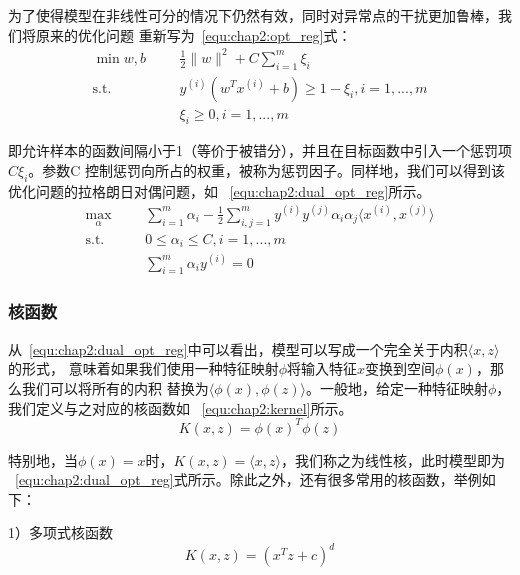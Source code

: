 为了使得模型在非线性可分的情况下仍然有效，同时对异常点的干扰更加鲁棒，我们将原来的优化问题
重新写为~\ref{equ:chap2:opt_reg}式：
\begin{equation}
  \label{equ:chap2:opt_reg}
  \begin{aligned}
    \min{w,b} &
    & & \frac{1}{2}\|w\|^2+C\sum_{i=1}^m\xi_i \\
    \text{s.t.} &
    & & y^{(i)}\left(w^Tx^{(i)}+b\right)\geq 1-\xi_i, i=1,...,m \\
    \quad &
    & & \xi_i \geq 0, i=1,...,m
  \end{aligned}
\end{equation}

即允许样本的函数间隔小于1（等价于被错分），并且在目标函数中引入一个惩罚项$C\xi_i$。参数C
控制惩罚向所占的权重，被称为惩罚因子。同样地，我们可以得到该优化问题的拉格朗日对偶问题，如
~\ref{equ:chap2:dual_opt_reg}所示。
\begin{equation}
  \label{equ:chap2:dual_opt_reg}
  \begin{aligned}
    \max_{\alpha} &
    & & \sum_{i=1}^m\alpha_i-\frac{1}{2}\sum_{i,j=1}^m
    y^{(i)}y^{(j)}\alpha_i\alpha_j\langle x^{(i)},x^{(j)}\rangle\\
    \text{s.t.} &
    & & 0\leq\alpha_i\leq C, i=1,...,m \\
    \quad &
    & & \sum_{i=1}^m\alpha_iy^{(i)}=0
  \end{aligned}
\end{equation}

\subsubsection{核函数}

从~\ref{equ:chap2:dual_opt_reg}中可以看出，模型可以写成一个完全关于内积$\langle x,z\rangle$的形式，
意味着如果我们使用一种特征映射$\phi$将输入特征$x$变换到空间$\phi(x)$，那么我们可以将所有的内积
替换为$\langle\phi(x),\phi(z)\rangle$。一般地，给定一种特征映射$\phi$，我们定义与之对应的核函数如
~\ref{equ:chap2:kernel}所示。
\begin{equation}
  \label{equ:chap2:kernel}
  K(x,z)=\phi(x)^T\phi(z)
\end{equation}

特别地，当$\phi(x)=x$时，$K(x,z)=\langle x,z\rangle$，我们称之为线性核，此时模型即为
~\ref{equ:chap2:dual_opt_reg}式所示。除此之外，还有很多常用的核函数，举例如下：

1）多项式核函数
\begin{equation}
  \label{equ:chap2:polynomial_kernel}
  K(x,z)=(x^Tz+c)^d
\end{equation}

